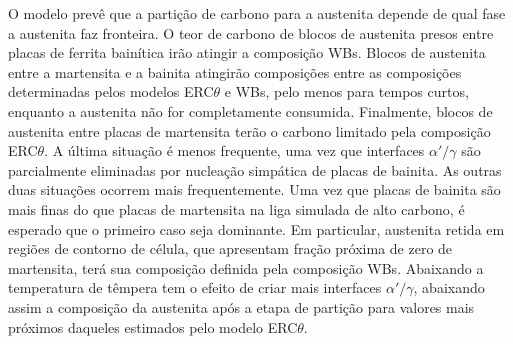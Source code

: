O modelo prevê que a partição de carbono para a austenita depende de qual fase a austenita faz fronteira. O teor de carbono de blocos de austenita presos entre placas de ferrita bainítica irão atingir a composição WBs. Blocos de austenita entre a martensita e a bainita atingirão composições entre as composições determinadas pelos modelos ERC$\theta$ e WBs, pelo menos para tempos curtos, enquanto a austenita não for completamente consumida. Finalmente, blocos de austenita entre placas de martensita terão o carbono limitado pela composição ERC$\theta$. A última situação é menos frequente, uma vez que interfaces $\alpha'/\gamma$ são parcialmente eliminadas por nucleação simpática de placas de bainita. As outras duas situações ocorrem mais frequentemente. Uma vez que placas de bainita são mais finas do que placas de martensita na liga simulada de alto carbono, é esperado que o primeiro caso seja dominante. Em particular, austenita retida em regiões de contorno de célula, que apresentam fração próxima de zero de martensita, terá sua composição definida pela composição WBs.
Abaixando a temperatura de têmpera tem o efeito de criar mais interfaces $\alpha'/\gamma$, abaixando assim a composição da austenita após a etapa de partição para valores mais próximos daqueles estimados pelo modelo ERC$\theta$.




% 
% 



